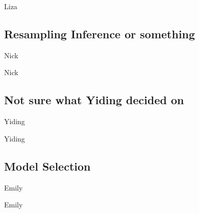 \documentclass[table]{beamer}
\begin{document}
\begin{frame}{Liza}

\end{frame}


\subsection{Resampling Inference or something}


\begin{frame}{Nick}


\end{frame}

\begin{frame}{Nick}

\end{frame}


\subsection{Not sure what Yiding decided on}


\begin{frame}{Yiding}

\end{frame}


\begin{frame}{Yiding}

\end{frame}


\subsection{Model Selection}

\begin{frame}{Emily}

\end{frame}


\begin{frame}{Emily}

\end{frame}

\end{document}
